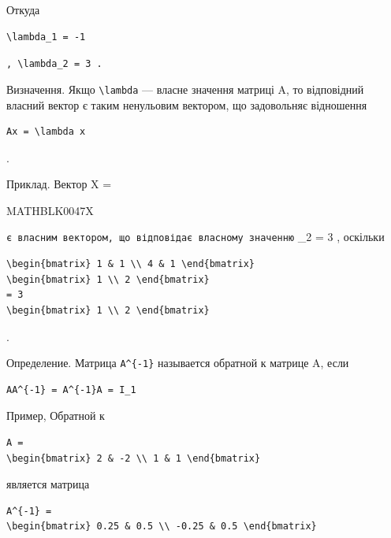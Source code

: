 \documentclass[
  ukrainian,
]{article}
\begin{document}
Откуда

\begin{verbatim}
\lambda_1 = -1
\end{verbatim}

\texttt{,\ \textquotesingle{}\textbackslash{}lambda\_2\ =\ 3\textquotesingle{}\ .}

Визначення. Якщо \texttt{\textbackslash{}lambda} --- власне значення
матриці A, то відповідний власний вектор є таким ненульовим вектором, що
задовольняє відношення

\begin{verbatim}
Ax = \lambda x
\end{verbatim}

.

Приклад. Вектор X =

MATHBLK0047X

\texttt{є\ власним\ вектором,\ що\ відповідає\ власному\ значенню}
\lambda\_2 = 3 , оскільки

\begin{verbatim}
\begin{bmatrix} 1 & 1 \\ 4 & 1 \end{bmatrix}
\begin{bmatrix} 1 \\ 2 \end{bmatrix}
= 3
\begin{bmatrix} 1 \\ 2 \end{bmatrix}
\end{verbatim}

.

Определение. Матрица \texttt{A\^{}\{-1\}} называется обратной к матрице
A, если

\begin{verbatim}
AA^{-1} = A^{-1}A = I_1
\end{verbatim}

Пример, Обратной к

\begin{verbatim}
A =
\begin{bmatrix} 2 & -2 \\ 1 & 1 \end{bmatrix}
\end{verbatim}

является матрица

\begin{verbatim}
A^{-1} =
\begin{bmatrix} 0.25 & 0.5 \\ -0.25 & 0.5 \end{bmatrix}
\end{verbatim}
\end{document}
